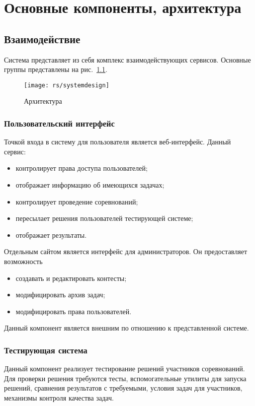 \chapter{Основные компоненты, архитектура}

\section{Взаимодействие}
Система представляет из себя комплекс взаимодействующих сервисов.
Основные группы представлены на рис.~\ref{fig:systemdesign}.

\begin{figure}
    \centering
    \texttt{[image: rs/systemdesign]}
    \caption{Архитектура}
    \label{fig:systemdesign}
\end{figure}

\subsection{Пользовательский интерфейс}
Точкой входа в систему для пользователя является веб-интерфейс.
Данный сервис:
\begin{itemize}
    \item контролирует права доступа пользователей;
    \item отображает информацию об имеющихся задачах;
    \item контролирует проведение соревнований;
    \item пересылает решения пользователей тестирующей системе;
    \item отображает результаты.
\end{itemize}

Отдельным сайтом является интерфейс для администраторов.
Он предоставляет возможность
\begin{itemize}
    \item создавать и редактировать контесты;
    \item модифицировать архив задач;
    \item модифицировать права пользователей.
\end{itemize}

Данный компонент является внешним по отношению к представленной системе.

\subsection{Тестирующая система}
Данный компонент реализует тестирование решений участников соревнований.
Для проверки решения требуются тесты, вспомогательные утилиты для запуска решений,
сравнения результатов с требуемыми, условия задач для участников,
механизмы контроля качества задач.

